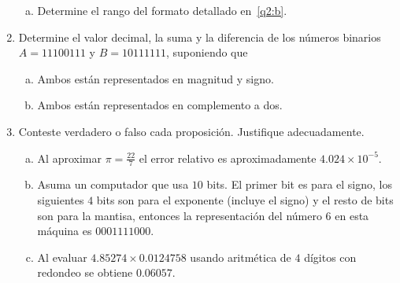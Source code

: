 \begin{frame}
\begin{enumerate}
\begin{enumerate}[a)]
            \item

                  Determine el rango del formato detallado
                  en~\eqref{q2:b}.
          \end{enumerate}

    \item

          Determine el valor decimal, la suma y la diferencia de los
          números binarios $A=11100111$ y $B=10111111$, suponiendo
          que

          \begin{multicols}{2}
            \begin{enumerate}[a)]
              \item

                    Ambos están representados en magnitud y signo.

              \item

                    Ambos están representados en complemento a dos.
            \end{enumerate}
          \end{multicols}

    \item

          Conteste verdadero o falso cada proposición.
          Justifique adecuadamente.

          \begin{enumerate}[a)]
            \item

                  Al aproximar $\pi=\frac{22}{7}$ el error
                  relativo es aproximadamente
                  $4.024\times 10^{-5}$.

            \item

                  Asuma un computador que usa $10$ bits.
                  El primer bit es para el signo, los siguientes $4$
                  bits son para el exponente (incluye el signo) y el
                  resto de bits son para la mantisa, entonces la
                  representación del número $6$ en esta máquina es
                  $0001111000$.

            \item

                  Al evaluar $4.85274\times 0.0124758$ usando
                  aritmética de $4$ dígitos con redondeo se obtiene
                  $0.06057$.
          \end{enumerate}


\end{enumerate}
\end{frame}
